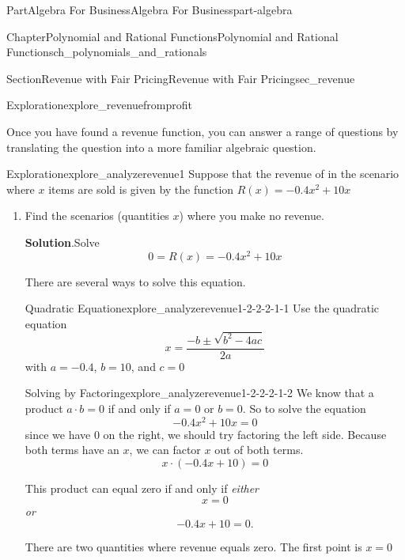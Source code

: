 \documentclass{tufte-book}
\newcommand{\blocktitlefont}{\relax}
\numberwithin{equation}{chapter}
\begin{document}
\begin{partptx}{Part}{Algebra For Business}{}{Algebra For Business}{}{}{part-algebra}
\begin{chapterptx}{Chapter}{Polynomial and Rational Functions}{}{Polynomial and Rational Functions}{}{}{ch_polynomials_and_rationals}
\begin{sectionptx}{Section}{Revenue with Fair Pricing}{}{Revenue with Fair Pricing}{}{}{sec_revenue}
\begin{exploration}{Exploration}{}{explore_revenuefromprofit}
\begin{enumerate}[font=\bfseries,label=(\alph*),ref=\alph*]
%
\end{enumerate}%
\end{exploration}%
Once you have found a revenue function, you can answer a range of questions by translating the question into a more familiar algebraic question.%
\begin{exploration}{Exploration}{}{explore_analyzerevenue1}%
Suppose that the revenue of in the scenario where \(x\) items are sold is given by the function \(R(x) = -0.4x^2 + 10x\)%
\begin{enumerate}[font=\bfseries,label=(\alph*),ref=\alph*]%
\item{}Find the scenarios (quantities \(x\)) where you make no revenue.%
\par\smallskip%
\noindent\textbf{\blocktitlefont Solution}.\hypertarget{explore_analyzerevenue1-2-2}{}\quad{}Solve%
\begin{equation*}
0 = R(x) = -0.4x^2 +10x 
\end{equation*}
%
\par
There are several ways to solve this equation.%
\begin{descriptionlist}
\begin{dlimedium}{Quadratic Equation}{explore_analyzerevenue1-2-2-2-1-1}%
Use the quadratic equation%
\begin{equation*}
x = \dfrac{-b \pm \sqrt{b^2 - 4 a c}}{2a}
\end{equation*}
with \(a=-0.4\), \(b=10\), and \(c=0\)%
\end{dlimedium}%
\begin{dlimedium}{Solving by Factoring}{explore_analyzerevenue1-2-2-2-1-2}%
We know that a product \(a\cdot b= 0\) if and only if \(a=0\) or \(b=0\). So to solve the equation%
\begin{equation*}
-0.4x^2 + 10x = 0
\end{equation*}
since we have 0 on the right, we should try factoring the left side. Because both terms have an \(x\), we can factor \(x\) out of both terms.%
\begin{equation*}
x\cdot (-0.4x + 10 ) = 0
\end{equation*}
%
\par
This product can equal zero if and only if \emph{either}%
\begin{equation*}
x=0
\end{equation*}
\emph{or}%
\begin{equation*}
-0.4x + 10 = 0\text{.}
\end{equation*}
%
\par
There are two quantities where revenue equals zero.  The first point is \(x=0\)%

\end{dlimedium}
\end{descriptionlist}
\end{enumerate}
\end{exploration}
\end{sectionptx}
\end{chapterptx}
\end{partptx}
\end{document}
